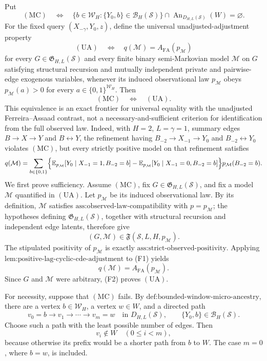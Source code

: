 Put
\[
\mathrm{(MC)}\quad\Longleftrightarrow\quad
\bigl\{b\in\mathcal W_H:\{Y_0,b\}\in\mathcal B_H(\mathcal S)\bigr\}
\cap\operatorname{An}_{D_{H,L}(\mathcal S)}(W)=\varnothing.
\]
For the fixed query \((X_{-\gamma},Y_0,z)\), define the universal unadjusted-adjustment property
\[
\mathrm{(UA)}\quad\Longleftrightarrow\quad
q(\mathcal M)=A_{\mathrm{FA}}(p_{\mathcal M})
\]
for every \(G\in\mathfrak G_{H,L}(\mathcal S)\) and every finite binary semi-Markovian model \(\mathcal M\) on \(G\) satisfying structural recursion and mutually independent private and pairwise-edge exogenous variables, whenever its induced observational law \(p_{\mathcal M}\) obeys \(p_{\mathcal M}(a)>0\) for every \(a\in\{0,1\}^{\mathcal W_H}\).  Then
\[
\mathrm{(MC)}\quad\Longleftrightarrow\quad\mathrm{(UA)}.
\]
This equivalence is an exact frontier for universal equality with the unadjusted Ferreira--Assaad contrast, not a necessary-and-sufficient criterion for identification from the full observed law.  Indeed, with \(H=2\), \(L=\gamma=1\), summary edges \(B\to X\to Y\) and \(B\leftrightarrow Y\), the refinement having \(B_{-2}\to X_{-1}\to Y_0\) and \(B_{-2}\leftrightarrow Y_0\) violates \(\mathrm{(MC)}\), but every strictly positive model on that refinement satisfies
\[
q(\mathcal M)=
\sum_{b\in\{0,1\}}
\Bigl\{
\mathbb E_{p_{\mathcal M}}[Y_0\mid X_{-1}=1,B_{-2}=b]
-
\mathbb E_{p_{\mathcal M}}[Y_0\mid X_{-1}=0,B_{-2}=b]
\Bigr\}p_{\mathcal M}(B_{-2}=b).
\]
We first prove sufficiency.  Assume \(\mathrm{(MC)}\), fix \(G\in\mathfrak G_{H,L}(\mathcal S)\), and fix a model \(\mathcal M\) quantified in \(\mathrm{(UA)}\).  Let \(p_{\mathcal M}\) be its induced observational law.  By its definition, \(\mathcal M\) satisfies \(\text{ass:observed-law-compatibility}\) with \(p=p_{\mathcal M}\); the hypotheses defining \(\mathfrak G_{H,L}(\mathcal S)\), together with structural recursion and independent edge latents, therefore give
\[
(G,\mathcal M)\in\mathfrak F(\mathcal S,L,H,p_{\mathcal M}).
\tag{F1}
\]
The stipulated positivity of \(p_{\mathcal M}\) is exactly \(\text{ass:strict-observed-positivity}\).  Applying \(\text{lem:positive-lag-cyclic-cde-adjustment}\) to (F1) yields
\[
q(\mathcal M)=A_{\mathrm{FA}}(p_{\mathcal M}).
\tag{F2}
\]
Since \(G\) and \(\mathcal M\) were arbitrary, (F2) proves \(\mathrm{(UA)}\).

For necessity, suppose that \(\mathrm{(MC)}\) fails.  By \(\text{def:bounded-window-micro-ancestry}\), there are a vertex \(b\in\mathcal W_H\), a vertex \(w\in W\), and a directed path
\[
v_0=b\to v_1\to\cdots\to v_m=w
\quad\text{in }D_{H,L}(\mathcal S),
\qquad
\{Y_0,b\}\in\mathcal B_H(\mathcal S).
\tag{F3}
\]
Choose such a path with the least possible number of edges.  Then
\[
v_i\notin W\quad(0\le i<m),
\tag{F4}
\]
because otherwise its prefix would be a shorter path from \(b\) to \(W\).  The case \(m=0\), where \(b=w\), is included.

